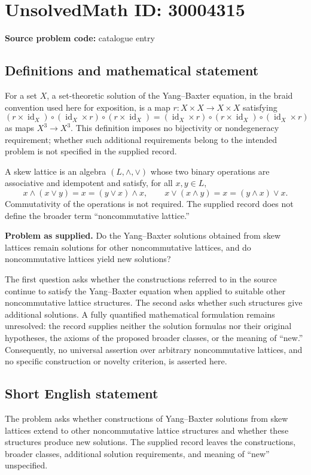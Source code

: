\documentclass[11pt]{article}
\begin{document}
\section*{UnsolvedMath ID: 30004315}
\textbf{Source problem code:} catalogue entry
\subsection{Definitions and mathematical statement}
For a set \(X\), a set-theoretic solution of the Yang--Baxter equation, in the braid convention used here for exposition, is a map \(r\colon X\times X\to X\times X\) satisfying
\[
(r\times\operatorname{id}_X)\circ(\operatorname{id}_X\times r)\circ(r\times\operatorname{id}_X)
=
(\operatorname{id}_X\times r)\circ(r\times\operatorname{id}_X)\circ(\operatorname{id}_X\times r)
\]
as maps \(X^3\to X^3\). This definition imposes no bijectivity or nondegeneracy requirement; whether such additional requirements belong to the intended problem is not specified in the supplied record.

A skew lattice is an algebra \((L,\wedge,\vee)\) whose two binary operations are associative and idempotent and satisfy, for all \(x,y\in L\),
\[
 x\wedge(x\vee y)=x=(y\vee x)\wedge x,
 \qquad
 x\vee(x\wedge y)=x=(y\wedge x)\vee x.
\]
Commutativity of the operations is not required. The supplied record does not define the broader term ``noncommutative lattice.''

\textbf{Problem as supplied.} Do the Yang--Baxter solutions obtained from skew lattices remain solutions for other noncommutative lattices, and do noncommutative lattices yield new solutions?

The first question asks whether the constructions referred to in the source continue to satisfy the Yang--Baxter equation when applied to suitable other noncommutative lattice structures. The second asks whether such structures give additional solutions. A fully quantified mathematical formulation remains unresolved: the record supplies neither the solution formulas nor their original hypotheses, the axioms of the proposed broader classes, or the meaning of ``new.'' Consequently, no universal assertion over arbitrary noncommutative lattices, and no specific construction or novelty criterion, is asserted here.
\subsection{Short English statement}
The problem asks whether constructions of Yang--Baxter solutions from skew lattices extend to other noncommutative lattice structures and whether these structures produce new solutions. The supplied record leaves the constructions, broader classes, additional solution requirements, and meaning of ``new'' unspecified.
\end{document}
